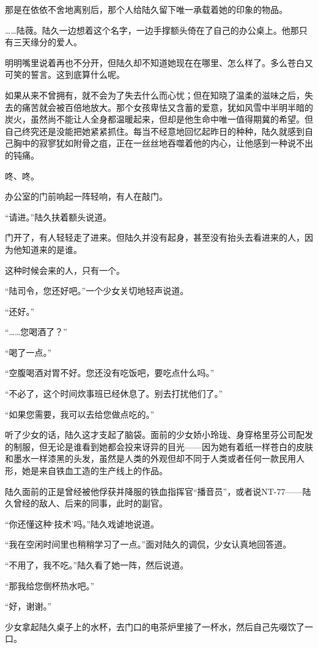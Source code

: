 那是在依依不舍地离别后，那个人给陆久留下唯一承载着她的印象的物品。

……陆薇。陆久一边想着这个名字，一边手撑额头倚在了自己的办公桌上。他那只有三天缘分的爱人。

明明嘴里说着再也不分开，但陆久却不知道她现在在哪里、怎么样了。多么苍白又可笑的誓言。这到底算什么呢。

如果从来不曾拥有，就不会为了失去什么而心忧；但在知晓了温柔的滋味之后，失去的痛苦就会被百倍地放大。那个女孩卑怯又含蓄的爱意，犹如风雪中半明半暗的炭火，虽然尚不能让人全身都温暖起来，但却是他生命中唯一值得期冀的希望。但自己终究还是没能把她紧紧抓住。每当不经意地回忆起昨日的种种，陆久就感到自己胸中的寂寥犹如附骨之疽，正在一丝丝地吞噬着他的内心，让他感到一种说不出的钝痛。

咚、咚。

办公室的门前响起一阵轻响，有人在敲门。

“请进。”陆久扶着额头说道。

门开了，有人轻轻走了进来。但陆久并没有起身，甚至没有抬头去看进来的人，因为他知道来的是谁。

这种时候会来的人，只有一个。

“陆司令，您还好吧。”一个少女关切地轻声说道。

“还好。”

“……您喝酒了？”

“喝了一点。”

“空腹喝酒对胃不好。您还没有吃饭吧，要吃点什么吗。”

“不必了，这个时间炊事班已经休息了。别去打扰他们了。”

“如果您需要，我可以去给您做点吃的。”

听了少女的话，陆久这才支起了脑袋。面前的少女娇小玲珑、身穿格里芬公司配发的制服，但无论是谁看到她都会投来讶异的目光——因为她有着纸一样苍白的皮肤和墨水一样漆黑的头发，虽然是人类的外观但却不同于人类或者任何一款民用人形，她是来自铁血工造的生产线上的作品。

陆久面前的正是曾经被他俘获并降服的铁血指挥官“播音员”，或者说NT-77——陆久曾经的敌人、后来的同事，此时的副官。

“你还懂这种‘技术’吗。”陆久戏谑地说道。

“我在空闲时间里也稍稍学习了一点。”面对陆久的调侃，少女认真地回答道。

“不用了，我不吃。”陆久看了她一阵，然后说道。

“那我给您倒杯热水吧。”

“好，谢谢。”

少女拿起陆久桌子上的水杯，去门口的电茶炉里接了一杯水，然后自己先啜饮了一口。

